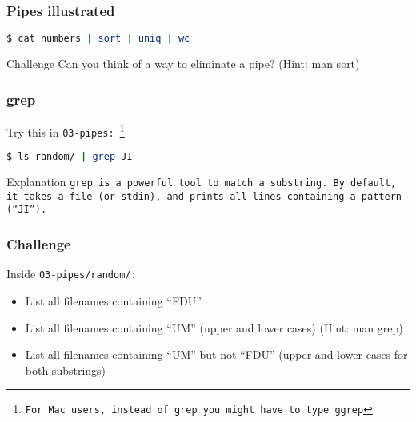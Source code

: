 \begin{frame}[fragile]
\frametitle{Pipes illustrated}
\begin{lstlisting}[language=bash]
$ cat numbers | sort | uniq | wc
\end{lstlisting}
\begin{figure}
    \centering
\end{figure}
\begin{block}{Challenge}
    Can you think of a way to eliminate a pipe? (Hint: man sort)
\end{block}
\end{frame}

\begin{frame}[fragile]
\frametitle{grep}
Try this in \tt{03-pipes}:
\footnote{For Mac users, instead of \tt{grep} you might have to type \tt{ggrep}}
\begin{lstlisting}[language=bash]
$ ls random/ | grep JI
\end{lstlisting}
\pause
\begin{block}{Explanation}
    \tt{grep} is a powerful tool to match a substring. By default, it takes
    a file (or stdin), and prints all lines containing a pattern (``JI'').
\end{block}
\end{frame}

\begin{frame}
\frametitle{Challenge}
Inside \tt{03-pipes/random/}:
\begin{itemize}
    \item List all filenames containing ``FDU''
    \item List all filenames containing ``UM'' (upper and lower cases)
        (Hint: man grep)
    \item List all filenames containing ``UM'' but not ``FDU''
        (upper and lower cases for both substrings)
\end{itemize}
\end{frame}

